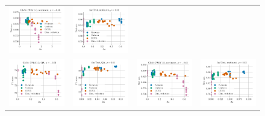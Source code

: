 \begin{figure}
\begin{tabular}{@{\hskip -0.0in}c@{\hskip -0.0in}c@{\hskip -0.0in}c@{\hskip -0.0in}c@{\hskip -0.0in}}
		\includegraphics[width=.245\linewidth]{figures/glove400k_sentiment_sst_test-acc_vs_gram-large-dim-delta2-4_linx_stoc.pdf} &
		\includegraphics[width=.245\linewidth]{figures/fasttext1m_sentiment_sst_test-acc_vs_gram-large-dim-delta2-4_linx_stoc.pdf} \\[-1em]
		\includegraphics[width=.245\linewidth]{figures/glove400k_qa_best-f1_vs_gram-large-dim-delta2-5_linx_stoc.pdf} &
		\includegraphics[width=.245\linewidth]{figures/fasttext1m_qa_best-f1_vs_gram-large-dim-delta2-5_linx_stoc.pdf} &
		\includegraphics[width=.245\linewidth]{figures/glove400k_sentiment_sst_test-acc_vs_gram-large-dim-delta2-5_linx_stoc.pdf} &
		\includegraphics[width=.245\linewidth]{figures/fasttext1m_sentiment_sst_test-acc_vs_gram-large-dim-delta2-5_linx_stoc.pdf} \\[-1em]

\end{tabular}
\end{figure}
